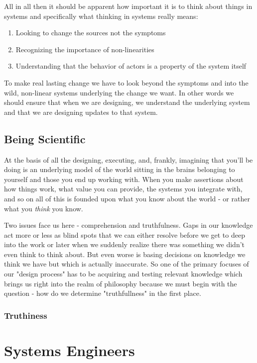 \documentclass[11pt,a5paper]{book}
\begin{document}
All in all then it should be apparent how important it is to think about things in systems and specifically what thinking in systems really means:

\begin{enumerate}
\item Looking to change the sources not the symptoms
\item Recognizing the importance of non-linearities
\item Understanding that the behavior of actors is a property of the system itself
\end{enumerate}

To make real lasting change we have to look beyond the symptoms and into the wild, non-linear systems underlying the change we want. In other words we should ensure that when we are designing, we understand the underlying system and that we are designing updates to that system.  

\section{Being Scientific}
At the basis of all the designing, executing, and, frankly, imagining that you'll be doing is an underlying model of the world sitting in the brains belonging to yourself and those you end up working with. When you make assertions about how things work, what value you can provide, the systems you integrate with, and so on all of this is founded upon what you know about the world - or rather what you \textit{think} you know. 
\newline

Two issues face us here - comprehension and truthfulness. Gaps in our knowledge act more or less as blind spots that we can either resolve before we get to deep into the work or later when we suddenly realize there was something we didn't even think to think about. But even worse is basing decisions on knowledge we think we have but which is actually inaccurate. So one of the primary focuses of our "design process" has to be acquiring and testing relevant knowledge which brings us right into the realm of philosophy because we must begin with the question - how do we determine "truthfullness" in the first place.

\subsection{Truthiness}

\chapter{Systems Engineers}
\end{document}
